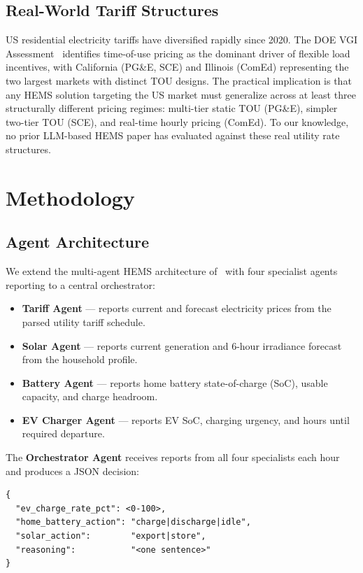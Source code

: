 \documentclass[conference]{IEEEtran}
\begin{document}
\subsection{Real-World Tariff Structures}
US residential electricity tariffs have diversified rapidly since 2020.
The DOE VGI Assessment~\cite{doe_vgi2025} identifies time-of-use pricing
as the dominant driver of flexible load incentives, with California (PG\&E,
SCE) and Illinois (ComEd) representing the two largest markets with distinct
TOU designs.
The practical implication is that any HEMS solution targeting the US
market must generalize across at least three structurally different
pricing regimes: multi-tier static TOU (PG\&E), simpler two-tier TOU
(SCE), and real-time hourly pricing (ComEd).
To our knowledge, no prior LLM-based HEMS paper has evaluated against
these real utility rate structures.

\section{Methodology}
\label{sec:methodology}

\subsection{Agent Architecture}
We extend the multi-agent HEMS architecture of~\cite{makroum2025agentic}
with four specialist agents reporting to a central orchestrator:

\begin{itemize}
  \item \textbf{Tariff Agent} --- reports current and forecast electricity
    prices from the parsed utility tariff schedule.
  \item \textbf{Solar Agent} --- reports current generation and 6-hour
    irradiance forecast from the household profile.
  \item \textbf{Battery Agent} --- reports home battery state-of-charge (SoC),
    usable capacity, and charge headroom.
  \item \textbf{EV Charger Agent} --- reports EV SoC, charging urgency,
    and hours until required departure.
\end{itemize}

The \textbf{Orchestrator Agent} receives reports from all four specialists
each hour and produces a JSON decision:

\begin{verbatim}
{
  "ev_charge_rate_pct": <0-100>,
  "home_battery_action": "charge|discharge|idle",
  "solar_action":        "export|store",
  "reasoning":           "<one sentence>"
}
\end{verbatim}
\end{document}
